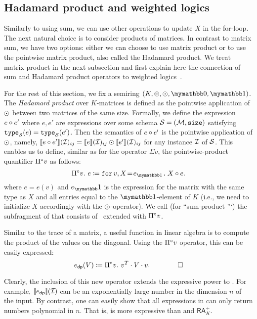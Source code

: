 \subsection{Hadamard product and weighted logics}\label{subsec:langprod}
Similarly to using sum, we can use other operations to update $X$ in the for-loop. The next natural choice is to consider products of matrices. In contrast to matrix sum, we have two options: either we can choose to use matrix product or to use the pointwise matrix product, also called the Hadamard product. We treat  matrix product in the next subsection and first explain here the connection of sum and Hadamard product operators to weighted logics~\cite{DrosteG05}.

For the rest of this section, we fix a semiring $(K, \ksum, \kprod, \kzero, \kone)$. The \textit{Hadamard product} over $K$-matrices is defined as the pointwise application of $\odot$ between two matrices of the same size. Formally, we define the expression $e \circ e'$ where $e, e'$ are expressions  over
some schema $\mathcal{S}=(\mathcal{M},\texttt{size})$ satisfying  $\texttt{type}_{\mathcal{S}}(e) = \texttt{type}_{\mathcal{S}}(e')$. Then the semantics of $e \circ e'$ is the pointwise application of $\odot$, namely, $\llbracket e \circ e' \rrbracket(\mathcal{I})_{ij} = \llbracket e \rrbracket(\mathcal{I})_{ij} \odot \llbracket e' \rrbracket(\mathcal{I})_{ij}$ for any instance $\mathcal{I}$ of $\mathcal{S}$. This enables us to define, similar as for the operator $\Sigma v$, the  pointwise-product quantifier $\Pi^{\circ} v$ as follows:
$$
\qhadprod v. \  e \coloneqq  \ffor{v}{X\!=\!e_{\kone}}{X \circ e}.
$$
where $e = e(v)$ and $e_\kone$ is the \langfor expression for the matrix with the same type as $X$ and all entries equal to the $\kone$-element of $K$ (i.e., we need to initialize $X$ accordingly with the $\odot$-operator).
We call \langprod  (for ``sum-product \lang''`) the subfragment of \langfor that consists of \langsum \ extended with $\Pi^{\circ} v$.

\begin{example}
	Similar to the trace of a matrix, a useful function in linear algebra is to compute the product of the values on the diagonal. 
	Using the $\Pi^{\circ} v$ operator, this can be easily expressed:
\begin{equation*}
	 e_{\mathsf{dp}}(V) \coloneqq  \Pi^{\circ} v. \ v^T\cdot V \cdot v. \tag*{$\qed$}
\end{equation*}
\end{example}

Clearly, the inclusion of this new operator extends the expressive power to \langsum. For example,  $\llbracket e_{\mathsf{dp}} \rrbracket(\mathcal{I})$ can be an exponentially large number in the dimension $n$ of the input.
By contrast, one can easily show that all expressions in \langsum can only return numbers polynomial in  $n$. That is, \langprod is more expressive than \langsum and $\mathsf{RA}_{K}^+$. 

